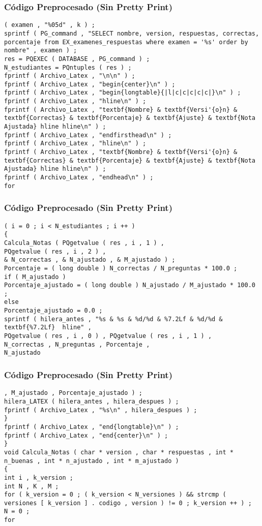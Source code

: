 \documentclass{beamer}
\begin{document}
\begin{frame}[fragile]
\frametitle{C\'odigo Preprocesado (Sin Pretty Print)}
\begin{lstlisting}[style=CStyle]
( examen , "%05d" , k ) ; 
sprintf ( PG_command , "SELECT nombre, version, respuestas, correctas, porcentaje from EX_examenes_respuestas where examen = '%s' order by nombre" , examen ) ; 
res = PQEXEC ( DATABASE , PG_command ) ; 
N_estudiantes = PQntuples ( res ) ; 
fprintf ( Archivo_Latex , "\n\n" ) ; 
fprintf ( Archivo_Latex , "begin{center}\n" ) ; 
fprintf ( Archivo_Latex , "begin{longtable}{|l|c|c|c|c|c|}\n" ) ; 
fprintf ( Archivo_Latex , "hline\n" ) ; 
fprintf ( Archivo_Latex , "textbf{Nombre} & textbf{Versi'{o}n} & textbf{Correctas} & textbf{Porcentaje} & textbf{Ajuste} & textbf{Nota Ajustada} hline hline\n" ) ; 
fprintf ( Archivo_Latex , "endfirsthead\n" ) ; 
fprintf ( Archivo_Latex , "hline\n" ) ; 
fprintf ( Archivo_Latex , "textbf{Nombre} & textbf{Versi'{o}n} & textbf{Correctas} & textbf{Porcentaje} & textbf{Ajuste} & textbf{Nota Ajustada} hline hline\n" ) ; 
fprintf ( Archivo_Latex , "endhead\n" ) ; 
for \end{lstlisting}
\end{frame}
\begin{frame}[fragile]
\frametitle{C\'odigo Preprocesado (Sin Pretty Print)}
\begin{lstlisting}[style=CStyle]
( i = 0 ; i < N_estudiantes ; i ++ ) 
{ 
Calcula_Notas ( PQgetvalue ( res , i , 1 ) , 
PQgetvalue ( res , i , 2 ) , 
& N_correctas , & N_ajustado , & M_ajustado ) ; 
Porcentaje = ( long double ) N_correctas / N_preguntas * 100.0 ; 
if ( M_ajustado ) 
Porcentaje_ajustado = ( long double ) N_ajustado / M_ajustado * 100.0 ; 
else 
Porcentaje_ajustado = 0.0 ; 
sprintf ( hilera_antes , "%s & %s & %d/%d & %7.2Lf & %d/%d & textbf{%7.2Lf}  hline" , 
PQgetvalue ( res , i , 0 ) , PQgetvalue ( res , i , 1 ) , 
N_correctas , N_preguntas , Porcentaje , 
N_ajustado \end{lstlisting}
\end{frame}
\begin{frame}[fragile]
\frametitle{C\'odigo Preprocesado (Sin Pretty Print)}
\begin{lstlisting}[style=CStyle]
, M_ajustado , Porcentaje_ajustado ) ; 
hilera_LATEX ( hilera_antes , hilera_despues ) ; 
fprintf ( Archivo_Latex , "%s\n" , hilera_despues ) ; 
} 
fprintf ( Archivo_Latex , "end{longtable}\n" ) ; 
fprintf ( Archivo_Latex , "end{center}\n" ) ; 
} 
void Calcula_Notas ( char * version , char * respuestas , int * n_buenas , int * n_ajustado , int * m_ajustado ) 
{ 
int i , k_version ; 
int N , K , M ; 
for ( k_version = 0 ; ( k_version < N_versiones ) && strcmp ( versiones [ k_version ] . codigo , version ) != 0 ; k_version ++ ) ; 
N = 0 ; 
for \end{lstlisting}
\end{frame}
\end{document}
